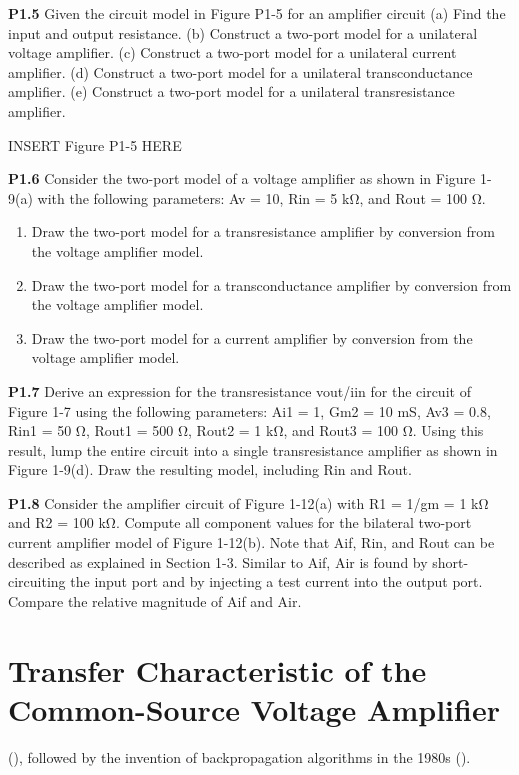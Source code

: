 \documentclass[
  11pt,
  letterpaper,
  abstract]{scrbook}
\providecommand{\tightlist}{%
  \setlength{\itemsep}{0pt}\setlength{\parskip}{0pt}}\usepackage{longtable,booktabs,array}
\begin{document}
\textbf{P1.5} Given the circuit model in Figure P1-5 for an amplifier
circuit (a) Find the input and output resistance. (b) Construct a
two-port model for a unilateral voltage amplifier. (c) Construct a
two-port model for a unilateral current amplifier. (d) Construct a
two-port model for a unilateral transconductance amplifier. (e)
Construct a two-port model for a unilateral transresistance amplifier.

INSERT Figure P1-5 HERE

\textbf{P1.6} Consider the two-port model of a voltage amplifier as
shown in Figure 1-9(a) with the following parameters: Av = 10, Rin = 5
kΩ, and Rout = 100 Ω.

\begin{enumerate}
\def\labelenumi{(\alph{enumi})}
\tightlist
\item
  Draw the two-port model for a transresistance amplifier by conversion
  from the voltage amplifier model.
\item
  Draw the two-port model for a transconductance amplifier by conversion
  from the voltage amplifier model.
\item
  Draw the two-port model for a current amplifier by conversion from the
  voltage amplifier model.
\end{enumerate}

\textbf{P1.7} Derive an expression for the transresistance vout/iin for
the circuit of Figure 1-7 using the following parameters: Ai1 = 1, Gm2 =
10 mS, Av3 = 0.8, Rin1 = 50 Ω, Rout1 = 500 Ω, Rout2 = 1 kΩ, and Rout3 =
100 Ω. Using this result, lump the entire circuit into a single
transresistance amplifier as shown in Figure 1-9(d). Draw the resulting
model, including Rin and Rout.

\textbf{P1.8} Consider the amplifier circuit of Figure 1-12(a) with R1 =
1/gm = 1 kΩ and R2 = 100 kΩ. Compute all component values for the
bilateral two-port current amplifier model of Figure 1-12(b). Note that
Aif, Rin, and Rout can be described as explained in Section 1-3. Similar
to Aif, Air is found by short-circuiting the input port and by injecting
a test current into the output port. Compare the relative magnitude of
Aif and Air.

\chapter{Transfer Characteristic of the Common-Source Voltage
Amplifier}\label{sec-dl_primer}

(), followed by
the invention of backpropagation algorithms in the 1980s
().
\end{document}
